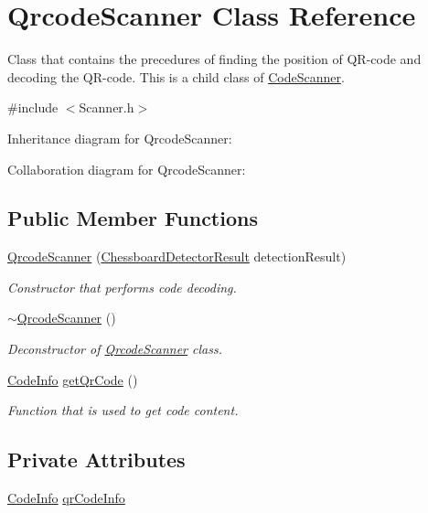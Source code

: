 \hypertarget{class_qrcode_scanner}{}\section{Qrcode\+Scanner Class Reference}
\label{class_qrcode_scanner}


Class that contains the precedures of finding the position of Q\+R-\/code and decoding the Q\+R-\/code. This is a child class of \hyperlink{class_code_scanner}{Code\+Scanner}.  




{\ttfamily \#include $<$Scanner.\+h$>$}



Inheritance diagram for Qrcode\+Scanner\+:


Collaboration diagram for Qrcode\+Scanner\+:
\subsection*{Public Member Functions}
\begin{DoxyCompactItemize}
\item 
\hyperlink{class_qrcode_scanner_a92f9835aab64e4129ae9efcd72bc7518}{Qrcode\+Scanner} (\hyperlink{struct_chessboard_detector_result}{Chessboard\+Detector\+Result} detection\+Result)
\begin{DoxyCompactList}\small\item\em Constructor that performs code decoding. \end{DoxyCompactList}\item 
\hyperlink{class_qrcode_scanner_ad8670545dad4e8918b94f870f184ce80}{$\sim$\+Qrcode\+Scanner} ()
\begin{DoxyCompactList}\small\item\em Deconstructor of \hyperlink{class_qrcode_scanner}{Qrcode\+Scanner} class. \end{DoxyCompactList}\item 
\hyperlink{struct_code_info}{Code\+Info} \hyperlink{class_qrcode_scanner_ae2f75fcf7fbe48678a57c2e0eb3ca163}{get\+Qr\+Code} ()
\begin{DoxyCompactList}\small\item\em Function that is used to get code content. \end{DoxyCompactList}\end{DoxyCompactItemize}
\subsection*{Private Attributes}
\begin{DoxyCompactItemize}
\item 
\hyperlink{struct_code_info}{Code\+Info} \hyperlink{class_qrcode_scanner_af93303c867d09d136c94015610071c91}{qr\+Code\+Info}
\end{DoxyCompactItemize}
